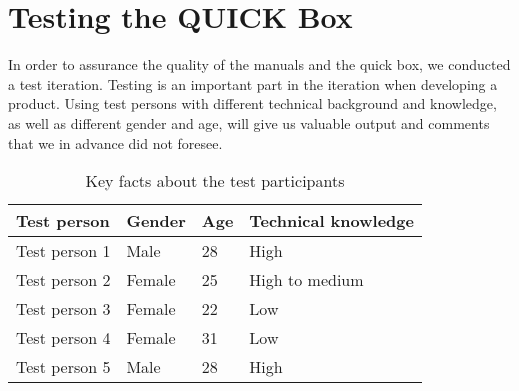 \chapter{Testing the QUICK Box}
\label{chp:test} 

In order to assurance the quality of the manuals and the \gls{quick} box, we conducted a test iteration. Testing is an important part in the iteration when developing a product. Using test persons with different technical background and knowledge, as well as different gender and age, will give us valuable output and comments that we in advance did not foresee. 

\begin{center}
\begin{table}[h!]
\caption{\label{tab:testpersons}Key facts about the test participants}
    \begin{tabular}{ | l | l | l | l |}
    \hline
    \textbf{Test person} & \textbf{Gender} & \textbf{Age} & \textbf{Technical knowledge} \\ 
    \hline
    Test person 1 &  Male & 28 & High\\ 
    \hline
    Test person 2 &  Female & 25 & High to medium\\  
    \hline
    Test person 3 &  Female & 22 & Low\\  
    \hline
    Test person 4 &  Female & 31 & Low \\  
    \hline
    Test person 5 &  Male & 28 & High\\  
    \hline
    \end{tabular}
   \end{table}
\end{center}